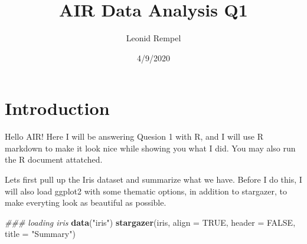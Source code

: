 \documentclass[
]{article}
\title{AIR Data Analysis Q1}
\author{Leonid Rempel}
\date{4/9/2020}
\newenvironment{Shaded}{\begin{snugshade}}{\end{snugshade}}
\newcommand{\CommentTok}[1]{\textcolor[rgb]{0.56,0.35,0.01}{\textit{#1}}}
\newcommand{\ControlFlowTok}[1]{\textcolor[rgb]{0.13,0.29,0.53}{\textbf{#1}}}
\newcommand{\DataTypeTok}[1]{\textcolor[rgb]{0.13,0.29,0.53}{#1}}
\newcommand{\DecValTok}[1]{\textcolor[rgb]{0.00,0.00,0.81}{#1}}
\newcommand{\KeywordTok}[1]{\textcolor[rgb]{0.13,0.29,0.53}{\textbf{#1}}}
\newcommand{\NormalTok}[1]{#1}
\newcommand{\OperatorTok}[1]{\textcolor[rgb]{0.81,0.36,0.00}{\textbf{#1}}}
\newcommand{\OtherTok}[1]{\textcolor[rgb]{0.56,0.35,0.01}{#1}}
\newcommand{\StringTok}[1]{\textcolor[rgb]{0.31,0.60,0.02}{#1}}
\begin{document}
\maketitle

\hypertarget{introduction}{%
\section{Introduction}\label{introduction}}

Hello AIR! Here I will be answering Quesion 1 with R, and I will use R
markdown to make it look nice while showing you what I did. You may also
run the R document attatched.

Lets first pull up the Iris dataset and summarize what we have. Before I
do this, I will also load ggplot2 with some thematic options, in
addition to stargazer, to make everyting look as beautiful as possible.

\begin{Shaded}
\end{Shaded}

\begin{Shaded}
\begin{Highlighting}[]
\CommentTok{### loading iris}
\KeywordTok{data}\NormalTok{(}\StringTok{"iris"}\NormalTok{)}
\KeywordTok{stargazer}\NormalTok{(iris, }\DataTypeTok{align =} \OtherTok{TRUE}\NormalTok{, }\DataTypeTok{header =} \OtherTok{FALSE}\NormalTok{, }\DataTypeTok{title =} \StringTok{"Summary"}\NormalTok{)}
\end{Highlighting}
\end{Shaded}
\end{document}
